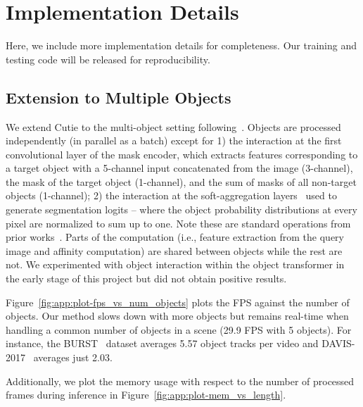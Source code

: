 \section{Implementation Details}\label{sec:app:implementation}
Here, we include more implementation details for completeness. 
Our training and testing code will be released for reproducibility.

\subsection{Extension to Multiple Objects}
We extend Cutie to the multi-object setting following~\cite{oh2019videoSTM,cheng2021stcn,cheng2022xmem,cheng2023tracking}. 
Objects are processed independently (in parallel as a batch) except for 
1) the interaction at the first convolutional layer of the mask encoder, which extracts features corresponding to a target object with a 5-channel input concatenated from the image (3-channel), the mask of the target object (1-channel), and the sum of masks of all non-target objects (1-channel); 
2) the interaction at the soft-aggregation layers~\cite{oh2019videoSTM} used to generate segmentation logits -- where the object probability distributions at every pixel are normalized to sum up to one. 
Note these are standard operations from prior works~\cite{oh2019videoSTM,cheng2021stcn,cheng2022xmem,cheng2023tracking}.
Parts of the computation (i.e., feature extraction from the query image and affinity computation) are shared between objects while the rest are not. 
We experimented with object interaction within the object transformer in the early stage of this project but did not obtain positive results. 

Figure~\ref{fig:app:plot-fps_vs_num_objects} plots the FPS against the number of objects. 
Our method slows down with more objects but remains real-time when handling a common number of objects in a scene (29.9 FPS with 5 objects). 
For instance, the BURST~\cite{athar2023burst} dataset averages 5.57 object tracks per video and DAVIS-2017~\cite{perazzi2016benchmark} averages just 2.03.

Additionally, we plot the memory usage with respect to the number of processed frames during inference in Figure~\ref{fig:app:plot-mem_vs_length}.

